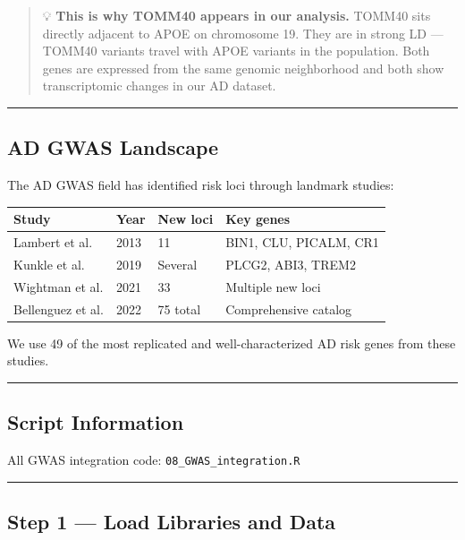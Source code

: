 \documentclass[
]{article}
\begin{document}
\begin{quote}
💡 \textbf{This is why TOMM40 appears in our analysis.} TOMM40 sits
directly adjacent to APOE on chromosome 19. They are in strong LD ---
TOMM40 variants travel with APOE variants in the population. Both genes
are expressed from the same genomic neighborhood and both show
transcriptomic changes in our AD dataset.
\end{quote}

\begin{center}\rule{0.5\linewidth}{0.5pt}\end{center}

\subsection{AD GWAS Landscape}\label{ad-gwas-landscape}

The AD GWAS field has identified risk loci through landmark studies:

\begin{longtable}[]{@{}llll@{}}
\toprule\noalign{}
Study & Year & New loci & Key genes \\
\midrule\noalign{}
\endhead
\bottomrule\noalign{}
\endlastfoot
Lambert et al. & 2013 & 11 & BIN1, CLU, PICALM, CR1 \\
Kunkle et al. & 2019 & Several & PLCG2, ABI3, TREM2 \\
Wightman et al. & 2021 & 33 & Multiple new loci \\
Bellenguez et al. & 2022 & 75 total & Comprehensive catalog \\
\end{longtable}

We use 49 of the most replicated and well-characterized AD risk genes
from these studies.

\begin{center}\rule{0.5\linewidth}{0.5pt}\end{center}

\subsection{Script Information}\label{script-information-3}

All GWAS integration code: \texttt{08\_GWAS\_integration.R}

\begin{center}\rule{0.5\linewidth}{0.5pt}\end{center}

\subsection{Step 1 --- Load Libraries and
Data}\label{step-1-load-libraries-and-data-1}
\end{document}
